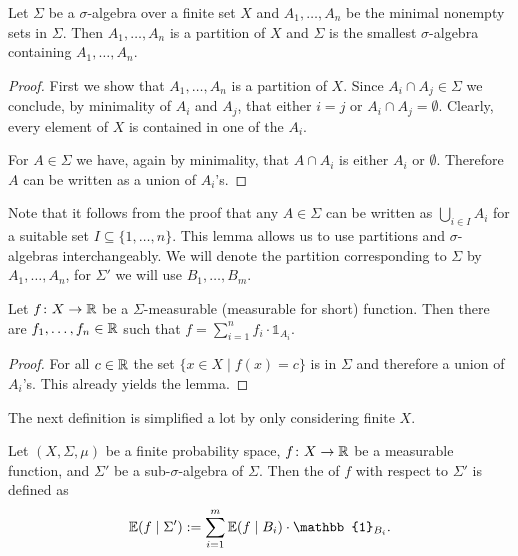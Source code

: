 \begin{lemma}
Let $\Sigma$ be a $\sigma$-algebra over a finite set $X$ and $A_1,\dots,A_n$ be the minimal nonempty sets in $\Sigma$. Then $A_1,\dots,A_n$ is a partition of $X$ and $\Sigma$ is the smallest $\sigma$-algebra containing $A_1,\dots,A_n$.
\end{lemma}
\begin{proof}
First we show that $A_1,\dots,A_n$ is a  partition of $X$. Since $A_i\cap A_j\in\Sigma$ we conclude, by minimality of $A_i$ and $A_j$, that either $i=j$ or $A_i\cap A_j=\emptyset$. Clearly, every element of $X$ is contained in one of the $A_i$. 

For $A\in\Sigma$ we have, again by minimality, that $A\cap A_i$ is either $A_i$ or $\emptyset$. Therefore $A$ can be written as a union of $A_i$'s.
\end{proof}
Note that it follows from the proof that any $A\in\Sigma$ can be written as $\bigcup_{i\in I}A_i$ for a suitable set $I\subseteq\{1,\dots,n\}$. This lemma allows us to use partitions and $\sigma$-algebras interchangeably. We will denote the partition corresponding to $\Sigma$ by $A_1,\dots,A_n$, for $\Sigma'$ we will use $B_1,\dots,B_{m}$.
\begin{lemma}\label{lem:measurabilityForm}
Let $f\colon X\to\mathbb{R}$ be a $\Sigma$-measurable (measurable for short) function. Then there are $f_1,\dots,f_n\in\mathbb{R}$ such that $f=\sum_{i=1}^{n}f_i\cdot\mathbb{1}_{A_i}$.
\end{lemma}
\begin{proof}
For all $c\in\mathbb{R}$ the set $\{x\in X\mid f(x)=c\}$ is in $\Sigma$ and therefore a union of $A_i$'s. This already yields the lemma.
\end{proof}

The next definition is simplified a lot by only considering finite $X$.

\begin{definition}
Let $(X,\Sigma,\mu)$ be a finite probability space, $f\colon X\to \mathbb{R}$ be a measurable function, and $\Sigma'$ be a sub-$\sigma$-algebra of $\Sigma$. Then the  of $f$ with respect to $\Sigma'$ is defined as
\[\E(f\mid \Sigma'):=\sum_{i=1}^{m}\E(f\mid B_i)\cdot \mathbb{1}_{B_i}.\]
\end{definition}


